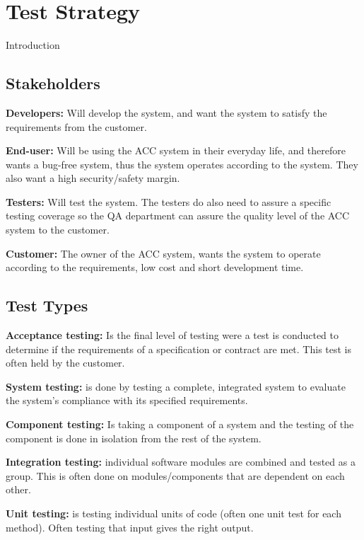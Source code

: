 \chapter{Test Strategy}
	
	{\Huge Introduction}

\clearpage
	\section{Stakeholders}

		{\bf Developers:} Will develop the system, and want the system to satisfy 
		the requirements from the customer. 

		{\bf End-user:} Will be using the ACC system in their everyday life, and therefore 
		wants a bug-free system, thus the system operates according to the system. 
		They also want a high security/safety margin.

		{\bf Testers:} Will test the system. The testers do also need to assure a 
		specific testing coverage so the QA department can assure the quality level 
		of the ACC system to the customer. 

		{\bf Customer:} The owner of the ACC system, wants the system to operate 
		according to the requirements, low cost and short development time.


	\section{Test Types}

		{\bf Acceptance testing:} Is the final level of testing were a test is conducted to determine 
		if the requirements of a specification or contract are met. This test is often held by the customer. 

		{\bf System testing:} is done by testing a complete, integrated system to evaluate the system's
		compliance with its specified requirements.
		
		{\bf Component testing:} Is taking a component of a system and the testing of the component 
		is done in isolation from the rest of the system.
		
		{\bf Integration testing:} individual software modules are combined and tested as a group. 
		This is often done on modules/components that are dependent on each other.
		
		{\bf Unit testing:} is testing individual units of code (often one unit test for each method).
		Often testing that input gives the right output.
	

